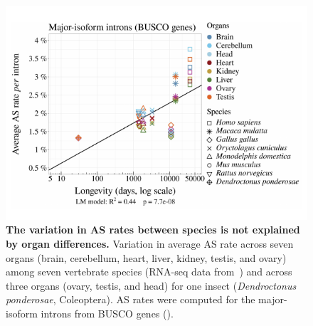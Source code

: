 \begin{figure}[t]   
    \begin{center}                                                                       
        \includegraphics {Figure5_supp.pdf}
    \end{center}                                                                       
    \caption[The variation in AS rates between species is not explained by organ differences]{\textbf{The variation in AS rates between species is not explained by organ differences.} Variation in average AS rate across seven organs (brain, cerebellum, heart, liver, kidney, testis, and ovary) among seven vertebrate species (RNA-seq data from~\citet{cardoso-moreira_gene_2019}) and across three organs (ovary, testis, and head) for one insect (\textit{Dendroctonus ponderosae}, Coleoptera). AS rates were computed for the major-isoform introns from BUSCO genes ().} 
    \label{supp_fig:AS5}
\end{figure}


